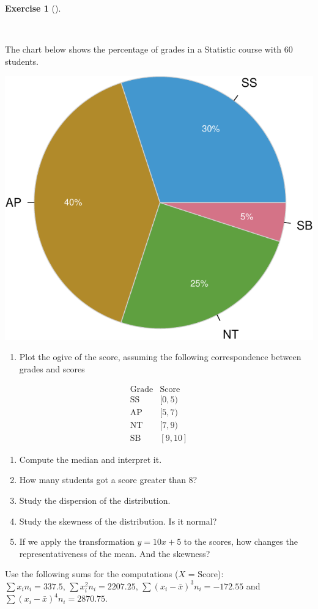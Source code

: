 \documentclass[
  a4paper,
]{scrreport}
\providecommand{\tightlist}{%
  \setlength{\itemsep}{0pt}\setlength{\parskip}{0pt}}\usepackage{longtable,booktabs,array}
\theoremstyle{definition}
\newtheorem{exercise}{Exercise}[chapter]
\theoremstyle{remark}
\begin{document}
\leavevmode{}%
\begin{exercise}[]\label{exr-1}

~

The chart below shows the percentage of grades in a Statistic course
with 60 students.

\includegraphics{./img/exam-2023-03-23/pie-chart-scores-1.pdf}

\begin{enumerate}
\def\labelenumi{\alph{enumi}.}
\tightlist
\item
  Plot the ogive of the score, assuming the following correspondence
  between grades and scores
\end{enumerate}

\[
\begin{array}{lc}
  \mbox{Grade} & \mbox{Score}\\
  \mbox{SS} & [0, 5)\\
  \mbox{AP} & [5, 7)\\
  \mbox{NT} & [7,9)\\
  \mbox{SB} & [9,10]
\end{array}
\]

\begin{enumerate}
\def\labelenumi{\alph{enumi}.}
\item
  Compute the median and interpret it.
\item
  How many students got a score greater than 8?
\item
  Study the dispersion of the distribution.
\item
  Study the skewness of the distribution. Is it normal?
\item
  If we apply the transformation \(y=10x+5\) to the scores, how changes
  the representativeness of the mean. And the skewness?
\end{enumerate}

Use the following sums for the computations (\(X\) = Score):\\
\(\sum x_in_i=337.5\), \(\sum x_i^2n_i=2207.25\),
\(\sum (x_i-\bar x)^3n_i=-172.55\) and
\(\sum (x_i-\bar x)^4n_i=2870.75\).

\end{exercise}
\end{document}

